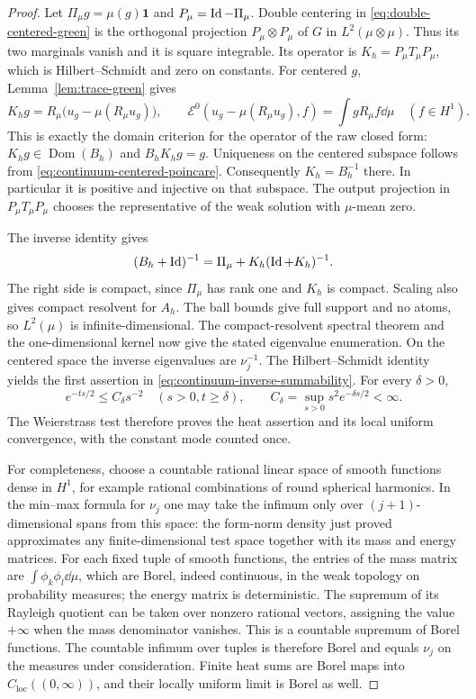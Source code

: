 \begin{proof}
Let $\Pi_\mu g=\mu(g)\mathbf1$ and $P_\mu=\operatorname{Id}-\Pi_\mu$.  Double
centering in \eqref{eq:double-centered-green} is the orthogonal projection
$P_\mu\otimes P_\mu$ of $G$ in $L^2(\mu\otimes\mu)$.  Thus its two
marginals vanish and it is square integrable.  Its operator is
$K_h=P_\mu T_\mu P_\mu$, which is Hilbert--Schmidt and zero on constants.
For centered $g$, Lemma~\ref{lem:trace-green} gives
\[
 K_hg=R_\mu\bigl(u_g-\mu(R_\mu u_g)\bigr),\qquad
 \mathcal E^0(u_g-\mu(R_\mu u_g),f)=\int g R_\mu f\dd\mu
 \quad(f\in H^1).
\]
This is exactly the domain criterion for the operator of the raw closed
form: $K_hg\in\operatorname{Dom}(B_h)$ and $B_hK_hg=g$.  Uniqueness on
the centered subspace follows from
\eqref{eq:continuum-centered-poincare}.  Consequently $K_h=B_h^{-1}$
there.  In particular it is positive and injective on that subspace.
The output projection in $P_\mu T_\mu P_\mu$ chooses the representative
of the weak solution with $\mu$-mean zero.

The inverse identity gives
\[
 (B_h+\operatorname{Id})^{-1}=\Pi_\mu+K_h(\operatorname{Id}+K_h)^{-1}.
\]
The right side is compact, since $\Pi_\mu$ has rank one and $K_h$ is
compact.  Scaling also gives compact resolvent for $A_h$.  The ball
bounds give full support and no atoms, so $L^2(\mu)$ is
infinite-dimensional.  The compact-resolvent spectral theorem and the
one-dimensional kernel now give the stated eigenvalue enumeration.
On the centered space the inverse eigenvalues are $\nu_j^{-1}$.
The Hilbert--Schmidt identity yields the first assertion in
\eqref{eq:continuum-inverse-summability}.  For every $\delta>0$,
\[
 e^{-t s/2}\le C_\delta s^{-2}
 \quad(s>0, t\ge\delta),
 \qquad C_\delta=\sup_{s>0}s^2e^{-\delta s/2}<\infty.
\]
The Weierstrass test therefore proves the heat assertion and its local
uniform convergence, with the constant mode counted once.

For completeness, choose a countable rational linear space of smooth
functions dense in $H^1$, for example rational combinations of round
spherical harmonics.  In the min--max formula for $\nu_j$ one may take
the infimum only over $(j+1)$-dimensional spans from this space: the
form-norm density just proved approximates any finite-dimensional test
space together with its mass and energy matrices.  For each fixed tuple
of smooth functions, the entries of the mass matrix are
$\int\phi_k\phi_l\dd\mu$, which are Borel, indeed continuous, in the
weak topology on probability measures; the energy matrix is deterministic.
The supremum of its Rayleigh quotient can be taken over nonzero rational
vectors, assigning the value $+\infty$ when the mass denominator vanishes.
This is a countable supremum of Borel functions.  The countable infimum
over tuples is therefore Borel and equals $\nu_j$ on the measures under
consideration.  Finite heat sums are Borel maps into
$C_{\mathrm{loc}}((0,\infty))$, and their locally uniform limit is
Borel as well.


\end{proof}
